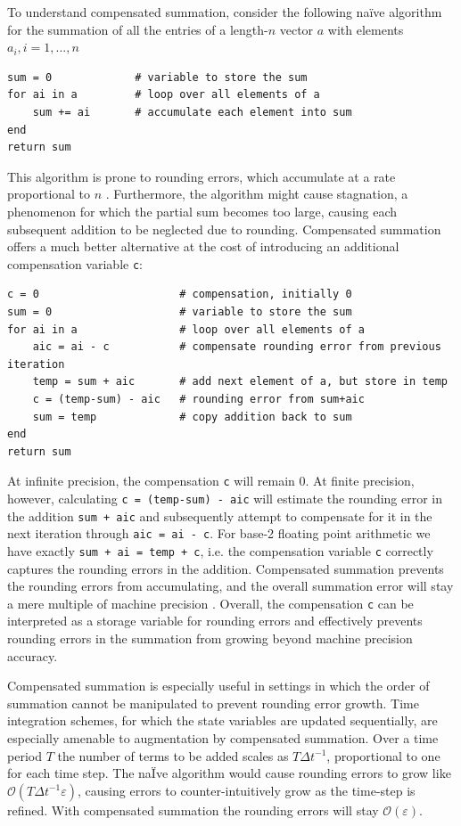 To understand compensated summation, consider the following naïve algorithm for the summation of all the
entries of a length-$n$ vector $a$ with elements $a_i, i = 1,...,n$

\begin{lstlisting}[language=JuliaLocal]
sum = 0             # variable to store the sum
for ai in a         # loop over all elements of a
	sum += ai       # accumulate each element into sum   
end
return sum
\end{lstlisting}

This algorithm is prone to rounding errors, which accumulate at a rate proportional to $n$ \citep{Higham1993}.
Furthermore, the algorithm might cause stagnation, a phenomenon for which the partial sum becomes too large,
causing each subsequent addition to be neglected due to rounding. Compensated summation offers a much
better alternative at the cost of introducing an additional compensation variable \texttt{c}:

\begin{lstlisting}[language=JuliaLocal]
c = 0                      # compensation, initially 0
sum = 0                    # variable to store the sum
for ai in a                # loop over all elements of a
	aic = ai - c           # compensate rounding error from previous iteration
 	temp = sum + aic       # add next element of a, but store in temp
	c = (temp-sum) - aic   # rounding error from sum+aic
 	sum = temp             # copy addition back to sum
end
return sum
\end{lstlisting}

At infinite precision, the compensation \texttt{c} will remain 0. At finite precision, however, calculating \texttt{c = (temp-sum) - aic}
will estimate the rounding error in the addition \texttt{sum + aic} and subsequently attempt to compensate for it in the next iteration
through \texttt{aic = ai - c}. For base-2 floating point arithmetic we have exactly \texttt{sum + ai = temp + c}, i.e. the compensation
variable \texttt{c} correctly captures the rounding errors in the addition. Compensated summation prevents the rounding errors
from accumulating, and the overall summation error will stay a mere multiple of machine precision \citep{Higham1993}. Overall,
the compensation \texttt{c} can be interpreted as a storage variable for rounding errors and effectively prevents rounding errors
in the summation from growing beyond machine precision accuracy.

Compensated summation is especially useful in settings in which the order of summation cannot be manipulated to prevent
rounding error growth. Time integration schemes, for which the state variables are updated sequentially, are especially
amenable to augmentation by compensated summation. Over a time period $T$ the number of terms to be added scales
as $T\Delta t^{-1}$, proportional to one for each time step. The naÏve algorithm would cause rounding errors to grow like
$\mathcal{O}(T\Delta t^{-1}\varepsilon)$, causing errors to counter-intuitively grow as the time-step is refined.
With compensated summation the rounding errors will stay $\mathcal{O}(\varepsilon)$.

